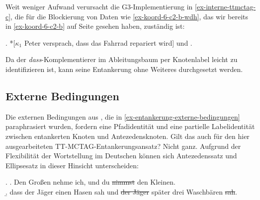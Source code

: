 Weit weniger Aufwand verursacht die G3-Implementierung in \ref{ex-interne-ttmctag-c}, die für die Blockierung von Daten wie \ref{ex-koord-6-c2-b-wdh}, das wir bereits in \ref{ex-koord-6-c2-b} auf Seite \pageref{ex-koord-6-c2-b} gesehen haben, zuständig ist: 

\ex. *[$\kappa_1$ Peter versprach, dass das Fahrrad repariert wird] und .\label{ex-koord-6-c2-b-wdh}

Da der {\it dass}-Komplementierer im Ableitungsbaum per Knotenlabel leicht zu identifizieren ist, kann seine Entankerung ohne Weiteres durchgesetzt werden. 


\subsection{Externe Bedingungen} 
	
Die externen Bedingungen aus \cite{Lichte:Kallmeyer:10}, die in \ref{ex-entankerung-externe-bedingungen} paraphrasiert wurden, fordern eine Pfadidentität und eine partielle Labelidentität zwischen entankerten Knoten und Antezedensknoten. Gilt das auch für den hier ausgearbeiteten TT-MCTAG-Entankerungs\-an\-satz? Nicht ganz. Aufgrund der Flexibilität der Wortstellung im Deutschen können sich Antezedenssatz und Ellipsesatz in dieser Hinsicht unterscheiden: 

\ex. \label{ex-deanchoring-10}
\a. Den Gro\ss en nehme ich, und du \sout{nimmst} den Kleinen.\\ \citep[262]{Oirsouw:87}
\b. dass der Jäger einen Hasen sah und \sout{der Jäger} später drei Waschbären \sout{sah}.\label{ex-deanchoring-10-b}

